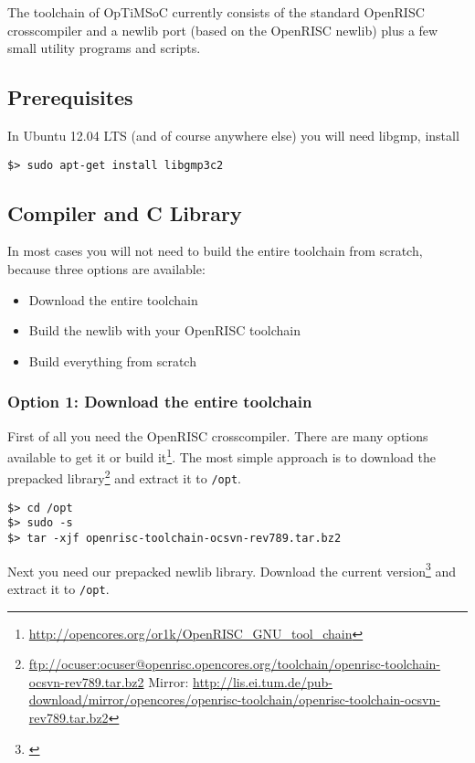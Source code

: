 The toolchain of OpTiMSoC currently consists of the standard OpenRISC
crosscompiler and a newlib port (based on the OpenRISC newlib) plus a
few small utility programs and scripts.

\subsection{Prerequisites}

In Ubuntu 12.04 LTS (and of course anywhere else) you will need
libgmp, install

\begin{verbatim}
$> sudo apt-get install libgmp3c2
\end{verbatim}

\subsection{Compiler and C Library}

In most cases you will not need to build the entire toolchain from
scratch, because three options are available:

\begin{itemize}
\item Download the entire toolchain
\item Build the newlib with your OpenRISC toolchain
\item Build everything from scratch 
\end{itemize}


\subsubsection{Option 1: Download the entire toolchain}
First of all you need the OpenRISC crosscompiler. There are many
options available to get it or build it\footnote{\url{http://opencores.org/or1k/OpenRISC_GNU_tool_chain}}. The most simple
approach is to download the prepacked
library\footnote{\url{ftp://ocuser:ocuser@openrisc.opencores.org/toolchain/openrisc-toolchain-ocsvn-rev789.tar.bz2}
Mirror: \url{http://lis.ei.tum.de/pub-download/mirror/opencores/openrisc-toolchain/openrisc-toolchain-ocsvn-rev789.tar.bz2}} and extract it
to \verb|/opt|.


\begin{verbatim}
$> cd /opt
$> sudo -s
$> tar -xjf openrisc-toolchain-ocsvn-rev789.tar.bz2
\end{verbatim}

Next you need our prepacked newlib library. Download the current
version\footnote{\url{}} and extract it to \verb|/opt|.

